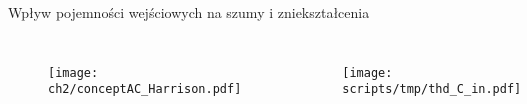 

\begin{frame}{Wpływ pojemności wejściowych na szumy i zniekształcenia}
    \begin{columns}
        \begin{figure}[H]
            \centering
            \texttt{[image: ch2/conceptAC\_Harrison.pdf]} 
        \end{figure}

    \begin{figure}[H]
        \centering
        \texttt{[image: scripts/tmp/thd\_C\_in.pdf]} 
    \end{figure}
\end{columns}

\end{frame}
